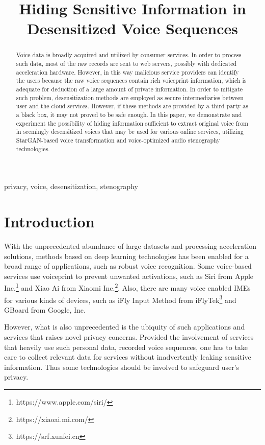 \documentclass[journal]{IEEEtran} %
\begin{document}
\title{Hiding Sensitive Information in Desensitized Voice Sequences}

\maketitle

\begin{abstract}
Voice data is broadly acquired and utilized by consumer services. In order to process such data, most of the raw records are sent to web servers, possibly with dedicated acceleration hardware. However, in this way malicious service providers can identify the users because the raw voice sequences contain rich voiceprint information, which is adequate for deduction of a large amount of private information. In order to mitigate such problem, desensitization methods are employed as secure intermediaries between user and the cloud services. However, if these methods are provided by a third party as a black box, it may not proved to be safe enough. In this paper, we demonstrate and experiment the possibility of hiding information sufficient to extract original voice from in seemingly desensitized voices that may be used for various online services, utilizing StarGAN-based voice transformation and voice-optimized audio stenography technologies.
\end{abstract}

\begin{IEEEkeywords}
    privacy, voice, desensitization, stenography
\end{IEEEkeywords}

\section{Introduction}
\label{seg:intro}

With the unprecedented abundance of large datasets and processing acceleration solutions, methods based on deep learning technologies has been enabled for a broad range of applications, such as robust voice recognition\cite{spkr_recg}. Some voice-based services use voiceprint to prevent unwanted activations, such as Siri from Apple Inc.\footnote{https://www.apple.com/siri/} and Xiao Ai from Xiaomi Inc.\footnote{https://xiaoai.mi.com/}. Also, there are many voice enabled IMEs for various kinds of devices, such as iFly Input Method from iFlyTek\footnote{https://srf.xunfei.cn} and GBoard from Google, Inc.

However, what is also unprecedented is the ubiquity of such applications and services that raises novel privacy concerns. Provided the involvement of services that heavily use such personal data, recorded voice sequences, one has to take care to collect relevant data for services without inadvertently leaking sensitive information. Thus some technologies should be involved to safeguard user's privacy.
\end{document}
